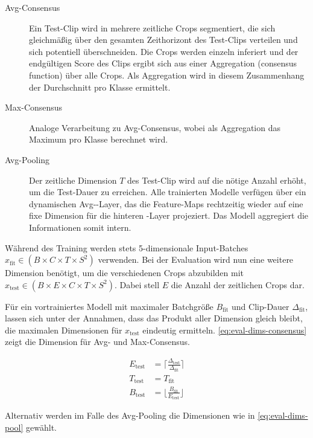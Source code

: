 \begin{description}
    \item[Avg-Consensus]
    Ein Test-Clip wird in mehrere zeitliche Crops segmentiert, die sich gleichmäßig über den gesamten Zeithorizont des Test-Clips verteilen und sich potentiell überschneiden.
    Die Crops werden einzeln inferiert und der endgültigen Score des Clips ergibt sich aus einer Aggregation (consensus function) über alle Crops.
    Als Aggregation wird in diesem Zusammenhang der Durchschnitt pro Klasse ermittelt.
    \item[Max-Consensus]
    Analoge Verarbeitung zu Avg-Consensus, wobei als Aggregation das Maximum pro Klasse berechnet wird.
    \item[Avg-Pooling]
    Der zeitliche Dimension $T$ des Test-Clip wird auf die nötige Anzahl erhöht, um die Test-Dauer zu erreichen.
    Alle trainierten Modelle verfügen über ein dynamischen Avg-\pool-Layer, das die Feature-Maps rechtzeitig wieder auf eine fixe Dimension für die hinteren \fc-Layer projeziert.
    Das Modell aggregiert die Informationen somit intern.
\end{description}

Während des Training werden stets 5-dimensionale Input-Batches $x_\text{fit} \in (B \times C \times T \times S^2)$ verwenden.
Bei der Evaluation wird nun eine weitere Dimension benötigt, um die verschiedenen Crops abzubilden mit $x_\text{test} \in (B \times E \times C \times T \times S^2)$.
Dabei stell $E$ die Anzahl der zeitlichen Crops dar.

Für ein vortrainiertes Modell mit maximaler Batchgröße $B_\text{fit}$ und Clip-Dauer $\Delta_\text{fit}$, lassen sich unter der Annahmen, dass das Produkt aller Dimension gleich bleibt, die maximalen Dimensionen für $x_\text{test}$ eindeutig ermitteln.
\autoref{eq:eval-dims-consensus} zeigt die Dimension für Avg- und Max-Consensus.

\begin{equation}
    \label{eq:eval-dims-consensus}
    \begin{split}
    E_\text{test}           & = \lceil  \frac{\Delta_\text{test}}{\Delta_\text{fit}}  \rceil \\
    T_\text{test}           & = T_{\text{fit}} \\
    B_\text{test}           & = \lfloor \frac{B_\text{fit}}{E_\text{test}} \rfloor
    \end{split}
\end{equation}

Alternativ werden im Falle des Avg-Pooling die Dimensionen wie in \autoref{eq:eval-dims-pool} gewählt.

